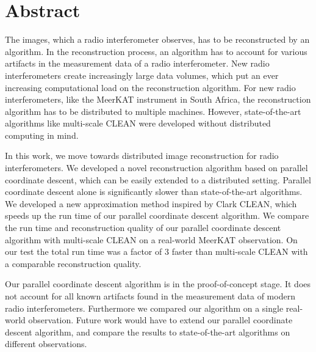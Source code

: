 \section*{Abstract}
The images, which a radio interferometer observes, has to be reconstructed by an algorithm. In the reconstruction process, an algorithm has to account for various artifacts in the measurement data of a radio interferometer. New radio interferometers create increasingly large data volumes, which put an ever increasing computational load on the reconstruction algorithm. For new radio interferometers, like the MeerKAT instrument in South Africa, the reconstruction algorithm has to be distributed to multiple machines. However, state-of-the-art algorithms like multi-scale CLEAN were developed without distributed computing in mind.

In this work, we move towards distributed image reconstruction for radio interferometers. We developed a novel reconstruction algorithm based on parallel coordinate descent, which can be easily extended to a distributed setting. Parallel coordinate descent alone is significantly slower than state-of-the-art algorithms. We developed a new approximation method inspired by Clark CLEAN, which speeds up the run time of our parallel coordinate descent algorithm. We compare the run time and reconstruction quality of our parallel coordinate descent algorithm with multi-scale CLEAN on a real-world MeerKAT observation. On our test the total run time was a factor of 3 faster than multi-scale CLEAN with a comparable reconstruction quality.

Our parallel coordinate descent algorithm is in the proof-of-concept stage. It does not account for all known artifacts found in the measurement data of modern radio interferometers. Furthermore we compared our algorithm on a single real-world observation. Future work would have to extend our parallel coordinate descent algorithm, and compare the results to state-of-the-art algorithms on different observations.



